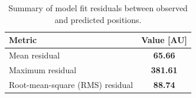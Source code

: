 \documentclass[linenumbers,trackchanges,astrosymb,]{aastex7}
\begin{document}
\begin{table}[ht!]
\centering
\caption{Summary of model fit residuals between observed and predicted positions.}
\label{tab:residuals}
\begin{tabular}{lc}
\hline
\textbf{Metric} & \textbf{Value [AU]} \\
\hline
Mean residual &  \textbf{65.66} \\
Maximum residual & \textbf{381.61} \\
Root-mean-square (RMS) residual & \textbf{88.74} \\
\hline
\end{tabular}
\end{table}

\clearpage




\end{document}
